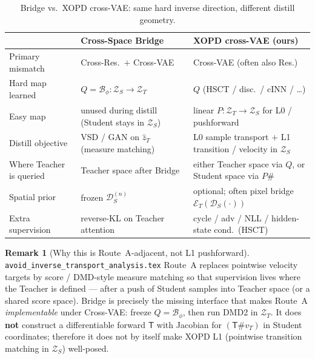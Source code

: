 \documentclass[11pt,a4paper]{article}
\newcommand{\Za}{\mathcal{Z}_{T}}
\newcommand{\Zb}{\mathcal{Z}_{S}}
\newcommand{\Enc}{\mathcal{E}}
\newcommand{\Dec}{\mathcal{D}}
\newcommand{\Bridge}{\mathcal{B}}
\newcommand{\Tmap}{\mathsf{T}}
\newcommand{\push}{\#}
\theoremstyle{definition}
\newtheorem{remark}{Remark}
\begin{document}
\begin{table}[h]
\centering
\small
\begin{tabular}{@{}p{3.2cm}p{4.6cm}p{4.6cm}@{}}
\toprule
& \textbf{Cross-Space Bridge} & \textbf{XOPD cross-VAE (ours)} \\
\midrule
Primary mismatch & Cross-Res.\ $+$ Cross-VAE & Cross-VAE (often also Res.) \\
Hard map learned & $Q=\Bridge_\phi:\Zb\to\Za$ & $Q$ (HSCT / disc.\ / cINN / \ldots) \\
Easy map & unused during distill (Student stays in $\Zb$) &
  linear $P:\Za\to\Zb$ for L0 / pushforward \\
Distill objective & VSD / GAN on $\hat z_T$ (measure matching) &
  L0 sample transport $+$ L1 transition / velocity in $\Zb$ \\
Where Teacher is queried & Teacher space after Bridge &
  either Teacher space via $Q$, or Student space via $P\push$ \\
Spatial prior & frozen $\Dec_S^{(n)}$ &
  optional; often pixel bridge $\Enc_T(\Dec_S(\cdot))$ \\
Extra supervision & reverse-KL on Teacher attention &
  cycle / adv / NLL / hidden-state cond.\ (HSCT) \\
\bottomrule
\end{tabular}
\caption{Bridge vs.\ XOPD cross-VAE: same hard inverse direction, different distill
geometry.}
\label{tab:compare}
\end{table}

\begin{remark}[Why this is Route~A-adjacent, not L1 pushforward]
\label{rem:route-a}
\texttt{avoid\_inverse\_transport\_analysis.tex} Route~A replaces pointwise velocity
targets by score / DMD-style measure matching so that supervision lives where the
Teacher is defined --- after a push of Student samples into Teacher space (or a shared
score space). Bridge is precisely the missing interface that makes Route~A
\emph{implementable} under Cross-VAE: freeze $Q=\Bridge_\phi$, then run DMD2 in
$\Za$. It does \textbf{not} construct a differentiable forward $\Tmap$ with Jacobian
for $(\Tmap\push v_T)$ in Student coordinates; therefore it does not by itself make
XOPD L1 (pointwise transition matching in $\Zb$) well-posed.
\end{remark}
\end{document}
